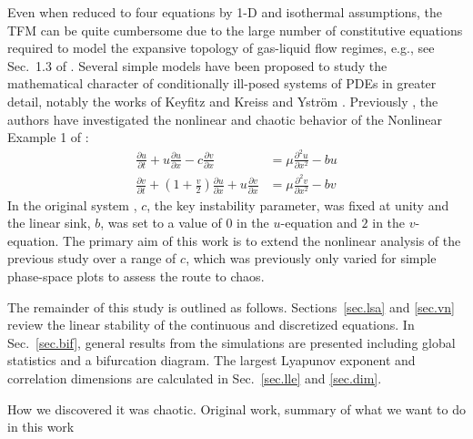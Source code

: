 \documentclass{ws-ijbc}
\newcommand\beqa{\begin{equation}\begin{aligned}}
\newcommand\eeqa{\end{aligned}\end{equation}}
\begin{document}
Even when reduced to four equations by 1-D and isothermal assumptions, the TFM can be quite cumbersome due to the large number of constitutive equations required to model the expansive topology of gas-liquid flow regimes, e.g., see Sec.~1.3 of \cite{ishiihibiki}. Several simple models have been proposed to study the mathematical character of conditionally ill-posed systems of PDEs in greater detail, notably the works of Keyfitz \cite{keyfitz03,keyfitz04} and Kreiss and Ystr\"{o}m \cite{kreiss02}. Previously \citep{fullmer14}, the authors have investigated the nonlinear and chaotic behavior of the Nonlinear Example 1 of \citet{kreiss02}: 
\beqa
\frac{\partial u}{\partial t} + u \frac{\partial u}{\partial x} - c \frac{\partial v}{\partial x} &= \mu \frac{{\partial}^2 u}{\partial x^2} - b u  \\
\frac{\partial v}{\partial t} + \left(1 + \frac{v}{2}\right) \frac{\partial u}{\partial x} + u \frac{\partial v}{\partial x} &= \mu \frac{\partial^2 v}{\partial x^2} - b v 
\label{eq.ky}
\eeqa
In the original system \citep{kreiss02}, $c$, the key instability parameter, was fixed at unity and the linear sink, $b$, was set to a value of $0$ in the $u$-equation and $2$ in the $v$-equation. The primary aim of this work is to extend the nonlinear analysis of the previous study over a range of $c$, which was previously only varied for simple phase-space plots to assess the route to chaos. 

The remainder of this study is outlined as follows. Sections~\ref{sec.lsa} and \ref{sec.vn} review the linear stability of the continuous and discretized equations. In Sec.~\ref{sec.bif}, general results from the simulations are presented including global statistics and a bifurcation diagram. The largest Lyapunov exponent and correlation dimensions are calculated in Sec.~\ref{sec.lle} and \ref{sec.dim}. 






How we discovered it was chaotic. 
Original work, summary of what we want to do in this work 


\end{document}
